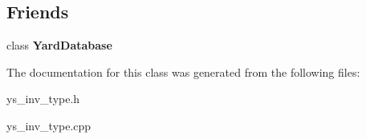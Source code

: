 \subsection*{Friends}
\begin{CompactItemize}
\item 
class {\bf Yard\-Database}\label{classYardInvType_n0}

\end{CompactItemize}


The documentation for this class was generated from the following files:\begin{CompactItemize}
\item 
ys\_\-inv\_\-type.h\item 
ys\_\-inv\_\-type.cpp\end{CompactItemize}
